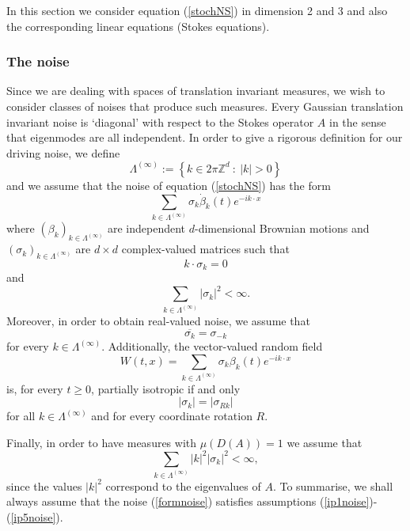 \documentclass[11pt]{preprint}
\begin{document}
In this section we consider equation (\ref{stochNS}) in dimension 2 and 3 and
also the corresponding linear equations (Stokes equations).

\subsubsection{The noise\label{subsubsectnoise}}

Since we are dealing with spaces of translation invariant measures, we wish
to consider classes of noises that produce such measures. Every Gaussian
translation invariant noise is `diagonal' with respect to the Stokes operator $A$
in the sense that eigenmodes are all independent. In order to give a rigorous
definition for our driving noise, we define
\[
\Lambda^{(\infty)}:=\left\{k\in 2\pi\mathbb{Z}^d\ :\ |k|>0\right\}
\]
and we assume that the noise of equation (\ref{stochNS}) has the form
\begin{equation}\label{formnoise}
\sum_{k\in\Lambda^{(\infty)}}\sigma_k{\dot\beta}_k(t)
e^{-ik\cdot x}
\end{equation}
where $(\beta_k)_{k\in\Lambda^{(\infty)}}$ are independent $d$-dimensional
Brownian motions and $(\sigma_k)_{k\in\Lambda^{(\infty)}}$ are $d\times d$
complex-valued matrices such that
\begin{equation}\label{ip1noise}
k\cdot\sigma_k=0
\end{equation}
and
\begin{equation}\label{ip2noise}
\sum_{k\in\Lambda^{(\infty)}}|\sigma_k|^2<\infty.
\end{equation}
Moreover, in order to obtain real-valued noise, we assume that
\begin{equation}
\overline{\sigma_k}=\sigma_{-k}\label{ip3noise}
\end{equation}
for every $k\in\Lambda^{(\infty)}$. Additionally, the vector-valued random field
\[
W(t,x)=\sum_{k\in\Lambda^{(\infty)}}\sigma_k\beta_k(t)e^{-ik\cdot x}
\]
is, for every $t\ge0$, partially isotropic if and only 
\begin{equation}\label{ip4noise}
|\sigma_k|=|\sigma_{Rk}|
\end{equation}
for all $k\in\Lambda^{(\infty)}$ and
for every coordinate rotation $R$.

Finally, in order to have measures with $\mu\left(  D(A)\right)  =1$ we assume that
\begin{equation}
\sum_{k\in\Lambda^{(\infty)}}|k|^2|\sigma_k|^2<\infty,
\label{ip5noise}%
\end{equation}
since the values $|k|^2$ correspond to the eigenvalues of $A$.
To summarise, we shall always assume that the
noise (\ref{formnoise}) satisfies assumptions (\ref{ip1noise})-(\ref{ip5noise}).
\end{document}
